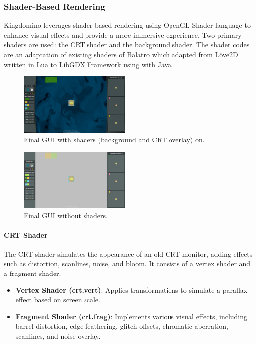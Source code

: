 \documentclass[conference]{IEEEtran}
\begin{document}
\subsubsection{Shader-Based Rendering}
Kingdomino leverages shader-based rendering using OpenGL Shader language to
enhance visual effects and provide a more immersive experience. Two primary
shaders are used: the CRT shader and the background shader. The shader codes
are an adaptation of existing shaders of Balatro\cite{wiki:balatro} which
adapted from Löve2D written in Lua to LibGDX Framework using with Java.

\begin{figure}[htbp]
    \centerline{\includegraphics[width=0.48\textwidth]{assets/ui.png}}
    \caption{Final GUI with shaders (background and CRT overlay) on.}\label{fig:ui}
\end{figure}

\begin{figure}[htbp]
    \centerline{\includegraphics[width=0.48\textwidth]{assets/UI-shaderoff.png}}
    \caption{Final GUI without shaders.}\label{fig:ui-shaderoff}
\end{figure}

\paragraph{CRT Shader}
The CRT shader simulates the appearance of an old CRT monitor, adding effects
such as distortion, scanlines, noise, and bloom. It consists of a vertex shader
and a fragment shader.

\begin{itemize}
    \item \textbf{Vertex Shader (crt.vert)}: Applies transformations to simulate a parallax effect based on screen scale.
    \item \textbf{Fragment Shader (crt.frag)}: Implements various visual effects, including barrel distortion, edge feathering, glitch offsets, chromatic aberration, scanlines, and noise overlay.
\end{itemize}
\end{document}
